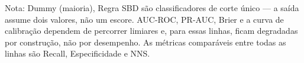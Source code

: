 \begin{flushleft}
\footnotesize Nota: Dummy (maioria), Regra SBD são classificadores de corte único — a saída assume dois valores, não um escore. AUC-ROC, PR-AUC, Brier e a curva de calibração dependem de percorrer limiares e, para essas linhas, ficam degradadas por construção, não por desempenho. As métricas comparáveis entre todas as linhas são Recall, Especificidade e NNS.
\end{flushleft}
